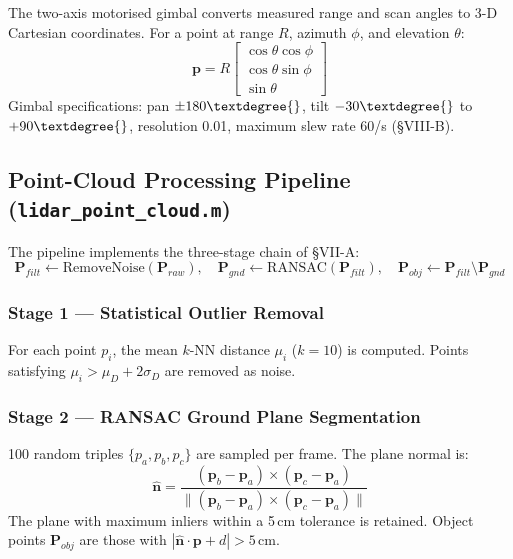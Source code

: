 \documentclass[12pt,a4paper]{article}
\begin{document}
The two-axis motorised gimbal converts measured range and scan angles to 3-D
Cartesian coordinates.  For a point at range $R$, azimuth $\phi$, and elevation
$\theta$:
\begin{equation}
    \mathbf{p} = R
    \begin{bmatrix}
        \cos\theta\cos\phi \\
        \cos\theta\sin\phi \\
        \sin\theta
    \end{bmatrix}
\end{equation}
Gimbal specifications: pan $\pm180\textdegree{}$, tilt $-30\textdegree{}$ to $+90\textdegree{}$,
resolution 0.01\textdegree{}, maximum slew rate 60\textdegree{}/s (\S VIII-B).

\subsection{Point-Cloud Processing Pipeline (\texttt{lidar\_point\_cloud.m})}

The pipeline implements the three-stage chain of \S VII-A:
\begin{equation}
    \mathbf{P}_{filt} \leftarrow \mathrm{RemoveNoise}(\mathbf{P}_{raw}),\quad
    \mathbf{P}_{gnd}  \leftarrow \mathrm{RANSAC}(\mathbf{P}_{filt}),\quad
    \mathbf{P}_{obj}  \leftarrow \mathbf{P}_{filt}\setminus\mathbf{P}_{gnd}
\end{equation}

\subsubsection{Stage 1 --- Statistical Outlier Removal}
For each point $p_i$, the mean $k$-NN distance $\mu_i$ ($k=10$) is computed.  Points
satisfying $\mu_i > \mu_D + 2\sigma_D$ are removed as noise.

\subsubsection{Stage 2 --- RANSAC Ground Plane Segmentation}
100 random triples $\{p_a, p_b, p_c\}$ are sampled per frame.  The plane normal is:
\begin{equation}
    \hat{\mathbf{n}} = \frac{(\mathbf{p}_b-\mathbf{p}_a)\times(\mathbf{p}_c-\mathbf{p}_a)}
                            {\|(\mathbf{p}_b-\mathbf{p}_a)\times(\mathbf{p}_c-\mathbf{p}_a)\|}
\end{equation}
The plane with maximum inliers within a 5\,cm tolerance is retained.  Object points
$\mathbf{P}_{obj}$ are those with $|\hat{\mathbf{n}}\cdot\mathbf{p}+d| > 5$\,cm.
\end{document}
